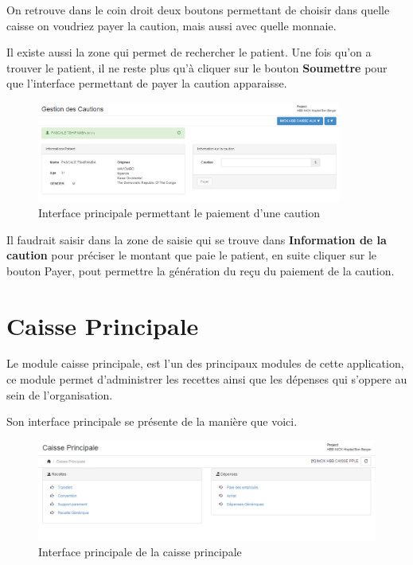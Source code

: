 \documentclass[12pt,a4paper]{report}
\begin{document}
On retrouve dans le coin droit deux boutons permettant de choisir dans quelle caisse on voudriez payer la caution, mais aussi avec quelle monnaie. 

Il existe aussi la zone qui permet de rechercher le patient. Une fois qu'on a trouver le patient, il ne reste plus qu'à cliquer sur le bouton \textbf{Soumettre} pour que l'interface permettant de payer la caution apparaisse.

\begin{figure}[h]
\begin{center}
\includegraphics[width=10cm]{pic/formGestionCaution.png}
\end{center}
\caption{Interface principale permettant le paiement d'une caution}
\label{Interface principale permettant le paiement d'une caution}
\end{figure}

Il faudrait saisir dans la zone de saisie qui se trouve dans \textbf{Information de la caution} pour préciser le montant que paie le patient, en suite cliquer sur le bouton Payer, pout permettre la génération du reçu du paiement de la caution.


\newpage 
\section{Caisse Principale}
Le module caisse principale, est l'un des principaux modules de cette application, ce module permet d'administrer les recettes ainsi que les dépenses qui s'oppere au sein de l'organisation.

Son interface principale se présente de la manière que voici.

\begin{figure}[h]
\begin{center}
\includegraphics[width=14cm]{pic/caissePrincipale.png}
\end{center}
\caption{Interface principale de la caisse principale}
\label{Interface principale de la caisse principale}
\end{figure}
\end{document}
